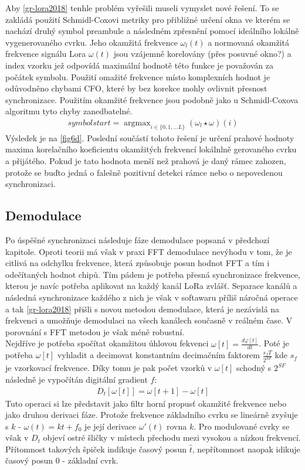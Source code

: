 \documentclass{ctuthesis}
\newcommand{\argmax}{\mathop{\mathrm{argmax}}}
\begin{document}
Aby \ref{gr-lora2018} tenhle problém vyřešili museli vymyslet nové řešení. To se zakládá použití Schmidl-Coxovi metriky pro přibližné určení okna ve kterém se nachází druhý symbol preambule a následném zpřesnění pomocí ideálního lokálně vygenerovaného cvrku. Jeho okamžitá frekvence $\omega_{l}(t)$ a normovaná okamžitá frekvence signálu Lora  $\omega(t)$ jsou vzájemně korelovány (přes posuvné okno?) a index vzorku jež odpovídá maximální hodnotě této funkce je považován za počátek symbolu. Použití omažité frekvence místo komplexních hodnot je odůvodněno chybami CFO, které by bez korekce mohly ovlivnit přesnost synchronizace. Použitím okamžité frekvence jsou podobně jako u Schmidl-Coxova algoritmu tyto chyby zanedbatelné.
\begin{align}
symbol start = \argmax_{i \in \{0,1,...L\}} (\omega_{l} \star \omega)(i)
\label{eq:lora6}
\end{align}
Výsledek je na \ref{fig6d}. Poslední součástí tohoto řešení je určení prahové hodnoty maxima korelačního koeficientu okamžitých frekvencí lokálnlně gerovaného cvrku a přijátého. Pokud je tato hodnota menší než prahová je daný rámec zahozen, protože se buďto jedná o falešně pozitivní detekci rámce nebo o nepovedenou synchronizaci.
\subsection{Demodulace}
\label{subsec:demodulace}
Po úspěšné synchronizaci následuje fáze demodulace popsaná v předchozí kapitole. Oproti teorii má však v praxi FFT demodulace nevýhodu v tom, že je citlivá na odchylku frekvence, která způsobuje posun hodnot FFT a tím i odečítaných hodnot chipů. Tím pádem je potřeba přesná synchronizace frekvence, kterou je navíc potřeba aplikovat na každý kanál LoRa zvlášť. Separace kanálů a následná synchronizace každého z nich je však v softawaru příliš náročná operace a tak \ref{gr-lora2018} přišli s novou metodou demodulace, která je nezávislá na frekvenci a umožňuje demodulaci na všech kanálech současně v reálném čase. V porovnání s FFT metodou je však méně robustní.\\
Nejdříve je potřeba spočítat okamžitou úhlovou fekvenci $\omega[t]=\frac{d\varphi[t]}{dt}$. Poté je potřeba $\omega[t]$ vyhladit a decimovat konstantním decimačním faktorem $\frac{s_fT}{2^{SF}}$ kde $s_f$ je vzorkovací frekvence. Díky tomu je pak počet vzorků v $\omega[t]$ schodný s $2^{SF}$ následně je vypočítán digitální gradient $f$:
\begin{align}
D_t[\omega[t]] = \omega[t+1]-\omega[t]
\label{eq:lora7}
\end{align}
Tuto operaci si lze představit jako filtr horní propusť okamžité frekvence nebo jako druhou derivaci fáze. Protože frekvence základního cvrku se lineárně zvyšuje s $k$ - $\omega(t) = kt + f_0$ je její derivace $\omega'(t)$ rovna $k$. Pro modulované cvrky se však v $D_t$ objeví ostré šličky v místech přechodu mezi vysokou a nízkou frekvencí. Přítomnost takových špiček indikuje časový posun $\hat{t}$, nepřítomnost naopak idikuje časový posun 0 - základní cvrk.\\
\end{document}
